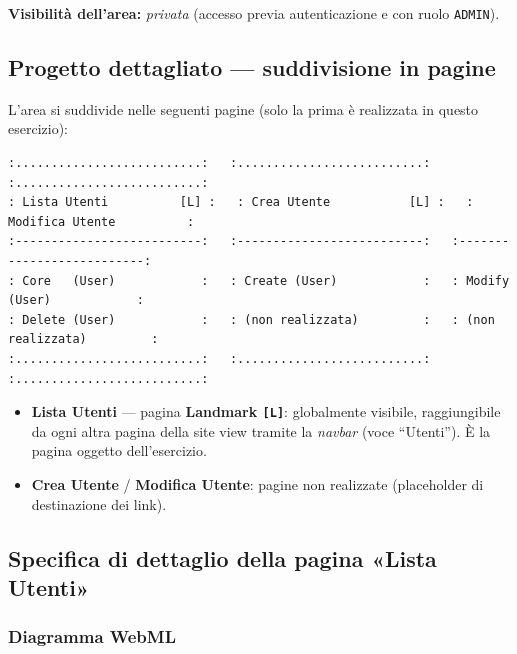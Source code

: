 \documentclass[11pt,a4paper]{article}
\newcommand{\code}[1]{\texttt{\small #1}}
\begin{document}
\textbf{Visibilità dell'area:} \emph{privata} (accesso previa autenticazione e con
ruolo \code{ADMIN}).

\subsection{Progetto dettagliato --- suddivisione in pagine}

L'area si suddivide nelle seguenti pagine (solo la prima è realizzata in questo
esercizio):

\begin{lstlisting}[style=diagram]
:..........................:   :..........................:   :..........................:
: Lista Utenti          [L] :   : Crea Utente           [L] :   : Modifica Utente          :
:--------------------------:   :--------------------------:   :--------------------------:
: Core   (User)            :   : Create (User)            :   : Modify (User)            :
: Delete (User)            :   : (non realizzata)         :   : (non realizzata)         :
:..........................:   :..........................:   :..........................:
\end{lstlisting}

\begin{itemize}[leftmargin=1.4em]
  \item \textbf{Lista Utenti} --- pagina \textbf{Landmark \code{[L]}}: globalmente
        visibile, raggiungibile da ogni altra pagina della site view tramite la
        \emph{navbar} (voce ``Utenti''). È la pagina oggetto dell'esercizio.
  \item \textbf{Crea Utente} / \textbf{Modifica Utente}: pagine non realizzate
        (placeholder di destinazione dei link).
\end{itemize}

\subsection{Specifica di dettaglio della pagina «Lista Utenti»}

\subsubsection{Diagramma WebML}
\end{document}
